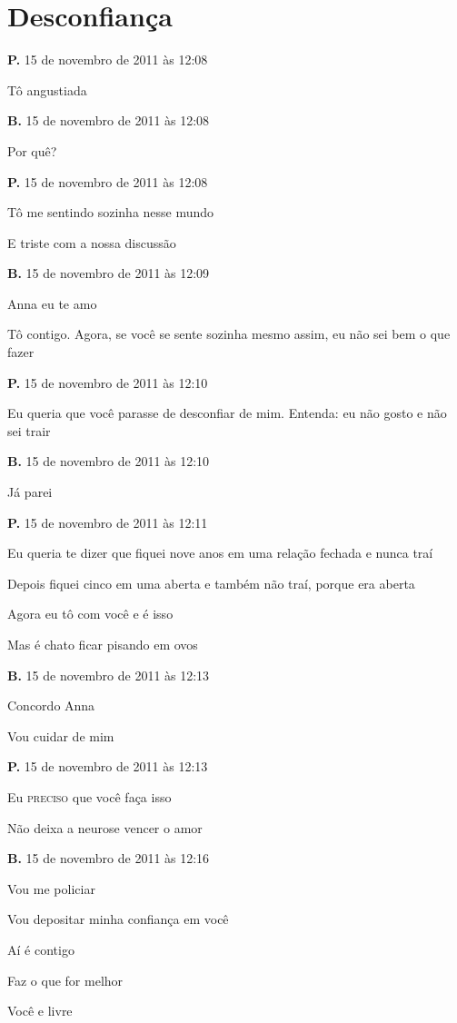 \chapter{Desconfiança}

\textbf{P.} 15 de novembro de 2011 às 12:08

Tô angustiada

\textbf{B.} 15 de novembro de 2011 às 12:08

Por quê?

\textbf{P.} 15 de novembro de 2011 às 12:08

Tô me sentindo sozinha nesse mundo

E triste com a nossa discussão

\textbf{B.} 15 de novembro de 2011 às 12:09

Anna eu te amo

Tô contigo. Agora, se você se sente sozinha mesmo assim, eu não sei bem
o que fazer

\textbf{P.} 15 de novembro de 2011 às 12:10

Eu queria que você parasse de desconfiar de mim. Entenda: eu não gosto e
não sei trair

\textbf{B.} 15 de novembro de 2011 às 12:10

Já parei

\textbf{P.} 15 de novembro de 2011 às 12:11

Eu queria te dizer que fiquei nove anos em uma relação fechada e nunca
traí

Depois fiquei cinco em uma aberta e também não traí, porque era aberta

Agora eu tô com você e é isso

Mas é chato ficar pisando em ovos

\textbf{B.} 15 de novembro de 2011 às 12:13

Concordo Anna

Vou cuidar de mim

\textbf{P.} 15 de novembro de 2011 às 12:13

Eu \textsc{preciso} que você faça isso

Não deixa a neurose vencer o amor

\textbf{B.} 15 de novembro de 2011 às 12:16

Vou me policiar

Vou depositar minha confiança em você

Aí é contigo

Faz o que for melhor

Você e livre

